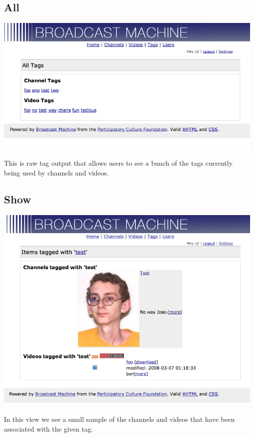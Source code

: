 \documentclass[a4paper,12pt]{report}
\begin{document}
\subsection{All}
\includegraphics[width=150mm]{images/tagall.png}

This is raw tag output that allows users to see a bunch of the tags currently being used by channels and videos.

\subsection{Show}
\includegraphics[width=150mm]{images/tagshow.png}

In this view we see a small sample of the channels and videos that have been associated with the given tag.
\end{document}
